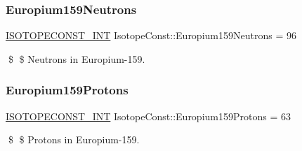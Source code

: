 \subsubsection{\texorpdfstring{Europium159\+Neutrons}{Europium159Neutrons}}
{\footnotesize\ttfamily \mbox{\hyperlink{group___isotope_const-_macros_ga5f18360b3e99483a35c32d789e62621c}{I\+S\+O\+T\+O\+P\+E\+C\+O\+N\+S\+T\+\_\+\+I\+NT}} Isotope\+Const\+::\+Europium159\+Neutrons = 96}

\$ \$ Neutrons in Europium-\/159. \mbox{\label{group___isotope_const-_europium-_eu159_ga28c62a97505b897626c99f26fc461b42}} 
\subsubsection{\texorpdfstring{Europium159\+Protons}{Europium159Protons}}
{\footnotesize\ttfamily \mbox{\hyperlink{group___isotope_const-_macros_ga5f18360b3e99483a35c32d789e62621c}{I\+S\+O\+T\+O\+P\+E\+C\+O\+N\+S\+T\+\_\+\+I\+NT}} Isotope\+Const\+::\+Europium159\+Protons = 63}

\$ \$ Protons in Europium-\/159. 